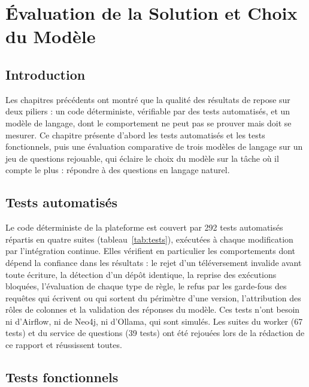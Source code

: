 \chapter{Évaluation de la Solution et Choix du Modèle}\label{chap:benchmark}

\section*{Introduction}
Les chapitres précédents ont montré que la qualité des résultats de \projet{} repose sur deux piliers : un code déterministe, vérifiable par des tests automatisés, et un modèle de langage, dont le comportement ne peut pas se prouver mais doit se mesurer. Ce chapitre présente d'abord les tests automatisés et les tests fonctionnels, puis une évaluation comparative de trois modèles de langage sur un jeu de questions rejouable, qui éclaire le choix du modèle sur la tâche où il compte le plus : répondre à des questions en langage naturel.

\section{Tests automatisés}

Le code déterministe de la plateforme est couvert par 292 tests automatisés répartis en quatre suites (tableau~\ref{tab:tests}), exécutées à chaque modification par l'intégration continue. Elles vérifient en particulier les comportements dont dépend la confiance dans les résultats : le rejet d'un téléversement invalide avant toute écriture, la détection d'un dépôt identique, la reprise des exécutions bloquées, l'évaluation de chaque type de règle, le refus par les garde-fous des requêtes qui écrivent ou qui sortent du périmètre d'une version, l'attribution des rôles de colonnes et la validation des réponses du modèle. Ces tests n'ont besoin ni d'Airflow, ni de Neo4j, ni d'Ollama, qui sont simulés. Les suites du worker (67 tests) et du service de questions (39 tests) ont été rejouées lors de la rédaction de ce rapport et réussissent toutes.

\section{Tests fonctionnels}

